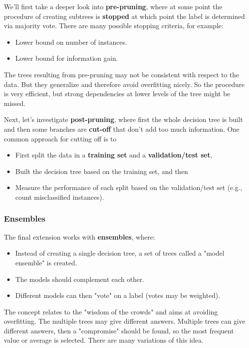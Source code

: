 We'll first take a deeper look into \textbf{pre-pruning}, where at some point the procedure of creating subtrees is \textbf{stopped} at which point the label is determined via majority vote. There are many possible stopping criteria, for example:
\begin{itemize}
  \item Lower bound on number of instances.
  \item Lower bound for information gain.
\end{itemize}
The trees resulting from pre-pruning may not be consistent with respect to the data. But they generalize and therefore avoid overfitting nicely. So the procedure is very efficient, but strong dependencies at lower levels of the tree might be missed.

Next, let's investigate \textbf{post-pruning}, where first the whole decision tree is built and then some branches are \textbf{cut-off} that don't add too much information. One common approach for cutting off is to
\begin{itemize}
  \item First split the data in a \textbf{training set} and a \textbf{validation/test set}, 
  \item Built the decision tree based on the training set, and then
  \item Measure the performance of each split based on the validation/test set (e.g., count misclassified instances).
\end{itemize}

\subsubsection*{Ensembles}

The final extension works with \textbf{ensembles}, where:
\begin{itemize}
  \item Instead of creating a single decision tree, a set of trees called a "model ensemble" is created.
  \item The models should complement each other.
  \item Different models can then "vote" on a label (votes may be weighted).
\end{itemize}

The concept relates to the "wisdom of the crowds" and aims at avoiding overfitting. The multiple trees may give different answers. Multiple trees can give different answers, then a "compromise" should be found, so the most frequent value or average is selected. There are many variations of this idea.

